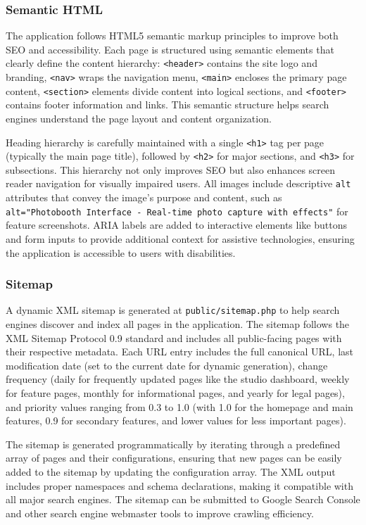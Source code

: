 \documentclass[12pt,a4paper]{article}
\begin{document}
\subsubsection{Semantic HTML}
The application follows HTML5 semantic markup principles to improve both SEO and accessibility. Each page is structured using semantic elements that clearly define the content hierarchy: \texttt{<header>} contains the site logo and branding, \texttt{<nav>} wraps the navigation menu, \texttt{<main>} encloses the primary page content, \texttt{<section>} elements divide content into logical sections, and \texttt{<footer>} contains footer information and links. This semantic structure helps search engines understand the page layout and content organization.

Heading hierarchy is carefully maintained with a single \texttt{<h1>} tag per page (typically the main page title), followed by \texttt{<h2>} for major sections, and \texttt{<h3>} for subsections. This hierarchy not only improves SEO but also enhances screen reader navigation for visually impaired users. All images include descriptive \texttt{alt} attributes that convey the image's purpose and content, such as \texttt{alt="Photobooth Interface - Real-time photo capture with effects"} for feature screenshots. ARIA labels are added to interactive elements like buttons and form inputs to provide additional context for assistive technologies, ensuring the application is accessible to users with disabilities.

\subsubsection{Sitemap}
A dynamic XML sitemap is generated at \texttt{public/sitemap.php} to help search engines discover and index all pages in the application. The sitemap follows the XML Sitemap Protocol 0.9 standard and includes all public-facing pages with their respective metadata. Each URL entry includes the full canonical URL, last modification date (set to the current date for dynamic generation), change frequency (daily for frequently updated pages like the studio dashboard, weekly for feature pages, monthly for informational pages, and yearly for legal pages), and priority values ranging from 0.3 to 1.0 (with 1.0 for the homepage and main features, 0.9 for secondary features, and lower values for less important pages).

The sitemap is generated programmatically by iterating through a predefined array of pages and their configurations, ensuring that new pages can be easily added to the sitemap by updating the configuration array. The XML output includes proper namespaces and schema declarations, making it compatible with all major search engines. The sitemap can be submitted to Google Search Console and other search engine webmaster tools to improve crawling efficiency.
\end{document}
